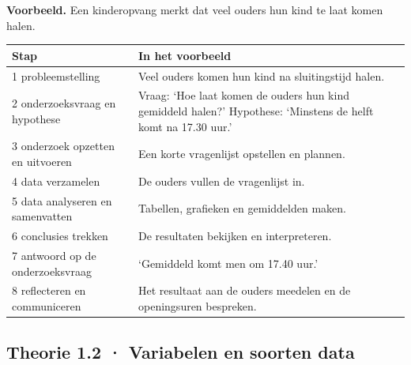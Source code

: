 \begin{voorbeeld}
\textbf{Voorbeeld.} Een kinderopvang merkt dat veel ouders hun kind te laat komen halen.

\begin{tabular}{ll}
\hline
Stap & In het voorbeeld \\
\hline
1 probleemstelling & Veel ouders komen hun kind na sluitingstijd halen. \\
2 onderzoeksvraag en hypothese & Vraag: ‘Hoe laat komen de ouders hun kind gemiddeld halen?’ Hypothese: ‘Minstens de helft komt na 17.30 uur.’ \\
3 onderzoek opzetten en uitvoeren & Een korte vragenlijst opstellen en plannen. \\
4 data verzamelen & De ouders vullen de vragenlijst in. \\
5 data analyseren en samenvatten & Tabellen, grafieken en gemiddelden maken. \\
6 conclusies trekken & De resultaten bekijken en interpreteren. \\
7 antwoord op de onderzoeksvraag & ‘Gemiddeld komt men om 17.40 uur.’ \\
8 reflecteren en communiceren & Het resultaat aan de ouders meedelen en de openingsuren bespreken. \\
\hline
\end{tabular}
\end{voorbeeld}

\subsection*{Theorie 1.2 · Variabelen en soorten data}

